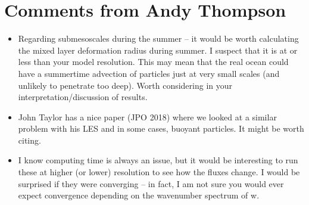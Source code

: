\documentclass[12pt,letter]{article}
\begin{document}
\section{Comments from Andy Thompson}
\begin{itemize}
	\item Regarding submesoscales during the summer -- it would be worth calculating the mixed layer deformation radius during summer.  I suspect that it is at or less than your model resolution.  This may mean that the real ocean could have a summertime advection of particles just at very small scales (and unlikely to penetrate too deep).  Worth considering in your interpretation/discussion of results.
	
	\item John Taylor has a nice paper (JPO 2018) where we looked at a similar problem with his LES and in some cases, buoyant particles. It might be worth citing.
	
	\item I know computing time is always an issue, but it would be interesting to run these at higher (or lower) resolution to see how the fluxes change.  I would be surprised if they were converging -- in fact, I am not sure you would ever expect convergence depending on the wavenumber spectrum of w.
\end{itemize}





\end{document}
